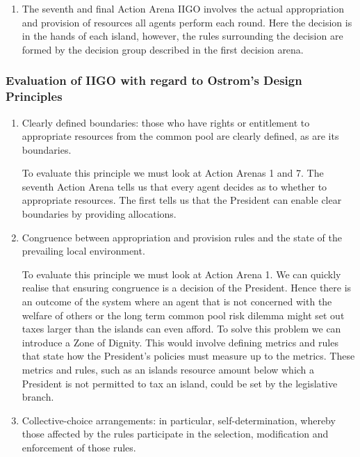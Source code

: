 \begin{itemize}
\begin{enumerate}
        \item The seventh and final Action Arena IIGO involves the actual appropriation and provision of resources all agents perform each round. Here the decision is in the hands of each island, however, the rules surrounding the decision are formed by the decision group described in the first decision arena. 
    \end{enumerate}
    
\end{itemize}
\subsubsection {Evaluation of IIGO with regard to Ostrom’s Design Principles} \label{sec:ostrom_eval}
\begin{enumerate}
    \item Clearly defined boundaries: those who have rights or entitlement to appropriate resources from the common pool are clearly defined, as are its boundaries.
    
    To evaluate this principle we must look at Action Arenas 1 and 7. The seventh Action Arena tells us that every agent decides as to whether to appropriate resources. The first tells us that the President can enable clear boundaries by providing allocations.
    
    \item Congruence between appropriation and provision rules and the state of the prevailing local environment.
    
    To evaluate this principle we must look at Action Arena 1. We can quickly realise that ensuring congruence is a decision of the President. Hence there is an outcome of the system where an agent that is not concerned with the welfare of others or the long term common pool risk dilemma might set out taxes larger than the islands can even afford. To solve this problem we can introduce a Zone of Dignity. This would involve defining metrics and rules that state how the President's policies must measure up to the metrics. These metrics and rules, such as an islands resource amount below which a President is not permitted to tax an island, could be set by the legislative branch.
    
    \item Collective-choice arrangements: in particular, self-determination, whereby those affected by the rules participate in the selection, modification and enforcement of those rules.
    

\end{enumerate}
